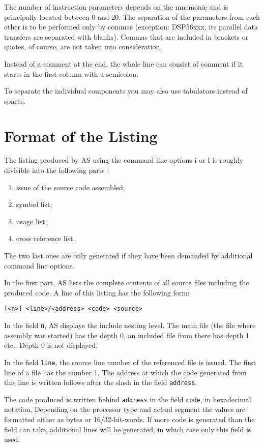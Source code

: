 \documentclass[12pt,twoside]{report}
\newcommand{\tty}[1]{{\tt #1}}
\begin{document}
The number of instruction parameters depends on the mnemonic and is 
principally located between 0 and 20.  The separation of the parameters 
from each other is to be performed only by commas (exception: DSP56xxx, 
its parallel data transfers are separated with blanks).  Commas that 
are included in brackets or quotes, of course, are not taken into 
consideration.  

Instead of a comment at the end, the whole line can consist of 
comment if it starts in the first column with a semicolon.

To separate the individual components you may also use tabulators
instead of spaces.


\section{Format of the Listing}

The listing produced by AS using the command line options i or I is 
roughly divisible into the following parts :
\begin{enumerate}
\item{issue of the source code assembled;}
\item{symbol list;}
\item{usage list;}
\item{cross reference list.}
\end{enumerate}
The two last ones are only generated if they have been demanded by 
additional command line options.

In the first part, AS lists the complete contents of all source files 
including the produced code.  A line of this listing has the following 
form:
\begin{verbatim}
[<n>] <line>/<address> <code> <source>
\end{verbatim}
In the field \tty{n}, AS displays the include nesting level.  The main file 
(the file where assembly was started) has the depth 0, an included 
file from there has depth 1 etc..  Depth 0 is not displayed.

In the field \tty{line}, the source line number of the referenced file is 
issued. The first line of a file has the number 1.  The address at 
which the code generated from this line is written follows after the 
slash in the field \tty{address}.

The code produced is written behind \tty{address} in the field \tty{code}, 
in hexadecimal notation. Depending on the processor type and actual 
segment the values are formatted either as bytes or 16/32-bit-words.
If more code is generated than the field can take, additional lines
will be  generated, in which case only this field is used.
\end{document}
